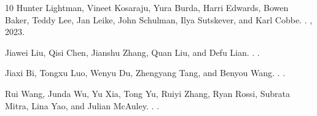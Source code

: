\begin{thebibliography}{10}
Hunter Lightman, Vineet Kosaraju, Yura Burda, Harri Edwards, Bowen Baker, Teddy
  Lee, Jan Leike, John Schulman, Ilya Sutskever, and Karl Cobbe.
.
, 2023.

Jiawei Liu, Qisi Chen, Jianshu Zhang, Quan Liu, and Defu Lian.
.
.

Jiaxi Bi, Tongxu Luo, Wenyu Du, Zhengyang Tang, and Benyou Wang.
.
.

Rui Wang, Junda Wu, Yu Xia, Tong Yu, Ruiyi Zhang, Ryan Rossi, Subrata Mitra,
  Lina Yao, and Julian McAuley.
.
.

\end{thebibliography}
